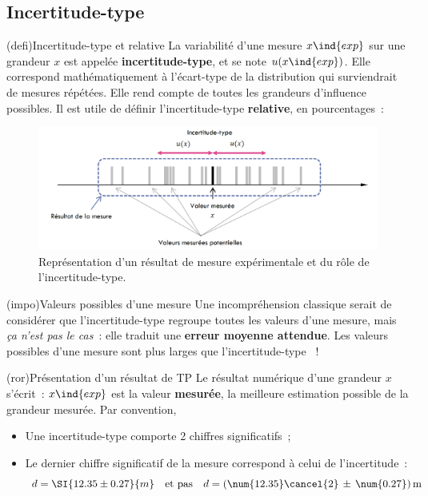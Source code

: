 \documentclass[../../main/main.tex]{subfiles}
\begin{document}
\subsection{Incertitude-type}
\begin{tcb*}[sidebyside, righthand ratio=.3](defi){Incertitude-type et relative}
	La variabilité d'une mesure $x\ind{exp}$ sur une grandeur $x$ est appelée
	\textbf{incertitude-type}, et se note $u(x\ind{exp})$. Elle correspond
	mathématiquement à l'écart-type de la distribution qui surviendrait de mesures
	répétées.
	\smallbreak
	Elle rend compte de toutes les grandeurs d'influence possibles.
	\tcblower
	Il est utile de définir l'incertitude-type \textbf{relative}, en
	pourcentages~:
	\psw{%
		\[
			\boxed{u_r(x\ind{exp}) = \frac{u(x\ind{exp})}{x\ind{exp}}}
		\]
	}%
	\vspace{-15pt}
\end{tcb*}
\begin{figure}[htbp]
	\centering
	\includegraphics[scale=1]{inctype}
	\caption{Représentation d'un résultat de mesure expérimentale et du rôle de
		l'incertitude-type.}
	\label{fig:inctype}
\end{figure}

\begin{tcb*}(impo){Valeurs possibles d'une mesure}
	Une incompréhension classique serait de considérer que l'incertitude-type
	regroupe toutes les valeurs d'une mesure, mais \textit{ça n'est pas le cas}~:
	elle traduit une \textbf{erreur moyenne attendue}.
	\smallbreak
	{\Large Les valeurs possibles d'une mesure sont plus larges que
		l'incertitude-type ~!}
\end{tcb*}

\begin{tcb*}[sidebyside, lefthand ratio=.4](ror){Présentation d'un résultat de
			TP}
	Le résultat numérique d'une grandeur $x$ s'écrit~:
	\psw{%
		\[
			\boxed{x = \left(x\ind{exp} \pm u(x\ind{exp})\right)10^{n} \, \text{unité}}
		\]
	}%
	$x\ind{exp}$ est la valeur \textbf{mesurée}, la meilleure estimation possible
	de la grandeur mesurée.
	\tcblower
	Par convention,
	\begin{itemize}
		\item Une incertitude-type comporte 2 chiffres significatifs~;
		\item Le dernier chiffre significatif de la mesure correspond à celui de
		      l'incertitude~:
		      \[
			      d = \SI{12.35\pm0.27}{m}
			      \quad \text{et pas} \quad
			      d = (\num{12.35}\cancel{2}\,\pm\,\num{0.27})\,\rm  m
		      \]
	\end{itemize}
\end{tcb*}
\end{document}
